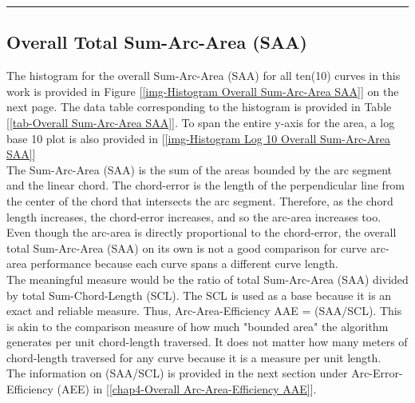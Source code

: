 \begin{landscape}
\begin{table}[ht]
{\begin{tabular}{ p{0.5cm} p{5.50cm} p{4.00cm} p{4.00cm} p{4.00cm} p{4.00cm} }
\end{tabular}
			
			
}   %
\hrule
\end{table}
\end{landscape}


\clearpage
\pagebreak

\subsection{Overall Total Sum-Arc-Area (SAA)}
\label{chap4-Overall Total Sum-Arc-Area SAA}

The histogram for the overall Sum-Arc-Area (SAA) for all ten(10) curves in this work is provided in Figure [\ref{img-Histogram Overall Sum-Arc-Area SAA}] on the next page. The data table corresponding to the histogram is provided in Table [\ref{tab-Overall Sum-Arc-Area SAA}]. To span the entire y-axis for the area, a log base 10 plot is also provided  in [\ref{img-Histogram Log 10 Overall Sum-Arc-Area SAA}]\\

The Sum-Arc-Area (SAA) is the sum of the areas bounded by the arc segment and the linear chord. The chord-error is the length of the perpendicular line from the center of the chord that intersects the arc segment. Therefore, as the chord length increases, the chord-error increases, and so the arc-area increases too. \\

Even though the arc-area is directly proportional to the chord-error, the overall total Sum-Arc-Area (SAA) on its own is not a good comparison for curve arc-area performance because each curve spans a different curve length. \\

The meaningful measure would be the ratio of total Sum-Arc-Area (SAA) divided by total Sum-Chord-Length (SCL). The SCL is used as a base because it is an exact and reliable measure. Thus, Arc-Area-Efficiency AAE = (SAA/SCL). This is akin to the comparison measure of how much "bounded area" the algorithm generates per unit chord-length traversed. It does not matter how many meters of chord-length traversed for any curve because it is a measure per unit length. \\
 
The information on (SAA/SCL) is provided in the next section under Arc-Error-Efficiency (AEE) in [\ref{chap4-Overall Arc-Area-Efficiency AAE}].



